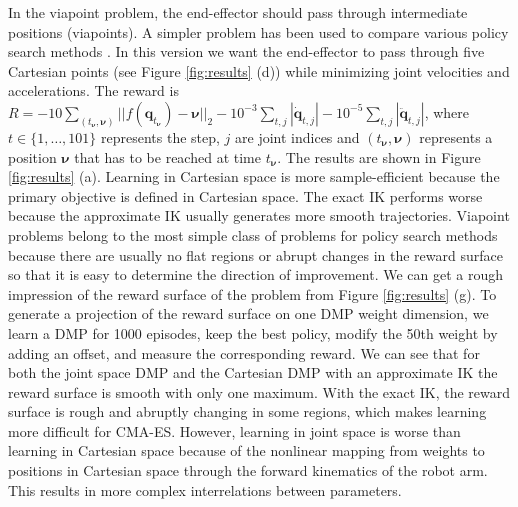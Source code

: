 \documentclass{svproc}
\begin{document}
In the viapoint problem, the end-effector should pass through intermediate positions (viapoints).
A simpler problem has been used to compare various policy search methods
\cite{Kober2010,Peters2006}.
In this version we want the end-effector to pass
through five Cartesian points (see Figure \ref{fig:results} (d))
while minimizing joint velocities and accelerations.
The reward is
$R = -10 \sum_{(t_{\boldsymbol{\nu}},\boldsymbol{\nu})} ||f(\boldsymbol{q}_{t_{\boldsymbol{\nu}}}) - \boldsymbol{\nu}||_2
  - 10^{-3} \sum_{t,j} |\dot{\boldsymbol{q}}_{t,j}|
  - 10^{-5} \sum_{t,j} |\ddot{\boldsymbol{q}}_{t,j}|$,
where $t \in \lbrace 1, \ldots, 101 \rbrace$ represents the step,
$j$ are joint indices and $(t_{\boldsymbol{\nu}}, \boldsymbol{\nu})$
represents a position $\boldsymbol{\nu}$ that has to be reached
at time $t_{\boldsymbol{\nu}}$.
The results are shown in Figure \ref{fig:results} (a).
Learning in Cartesian space is more sample-efficient because the
primary objective is defined in Cartesian space.
The exact IK performs worse because the approximate IK
usually generates more smooth trajectories.
Viapoint problems belong to the most simple class of problems for
policy search methods because there are usually no flat regions or
abrupt changes in the reward surface so that it is easy to determine
the direction of improvement.
We can get a rough impression of the reward surface of the problem
from Figure \ref{fig:results} (g).
To generate a projection of the reward surface on one DMP weight
dimension, we learn a DMP for 1000 episodes, keep the best policy,
modify the 50th weight by adding an offset, and measure the
corresponding reward.
We can see that for both the joint space DMP and the Cartesian DMP
with an approximate IK the reward surface is
smooth with only one maximum. With the exact IK, the reward
surface is rough and abruptly changing in some regions, which
makes learning more difficult for CMA-ES. However, learning in joint
space is worse than learning in Cartesian space because of the
nonlinear mapping from weights to positions in Cartesian space
through the forward kinematics of the robot arm.
This results in more complex interrelations between parameters.

\end{document}
